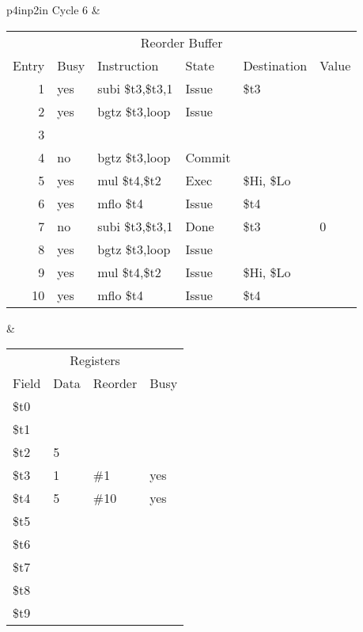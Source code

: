 \noindent
\begin{tabular}{p{4in}p{2in}}
Cycle 6 & \\ \hline \hline

\begin{tabular}{rlp{.9in}lll}
\multicolumn{6}{c}{Reorder Buffer} \\
Entry & Busy & Instruction        & State & Destination & Value \\ \hline
 1    & yes  & subi \$t3,\$t3,1   & Issue & \$t3        &       \\
 2    & yes  & bgtz \$t3,loop     & Issue &             &       \\
 3    &      &                    &       &             &       \\
 4    & no   & bgtz \$t3,loop     & Commit&             &       \\
 5    & yes  & mul  \$t4,\$t2     & Exec  & \$Hi, \$Lo  &       \\
 6    & yes  & mflo \$t4          & Issue & \$t4        &       \\
 7    & no   & subi \$t3,\$t3,1   & Done  & \$t3        & 0     \\
 8    & yes  & bgtz \$t3,loop     & Issue &             &       \\
 9    & yes  & mul  \$t4,\$t2     & Issue & \$Hi, \$Lo  &       \\
10    & yes  & mflo \$t4          & Issue & \$t4        &       \\
\end{tabular} &

\begin{tabular}{llll}
\multicolumn{4}{c}{Registers} \\
Field & Data & Reorder & Busy \\ \hline
\$t0  &      &         &      \\
\$t1  &      &         &      \\
\$t2  & 5    &         &      \\
\$t3  & 1    & \#1     & yes  \\
\$t4  & 5    & \#10    & yes  \\
\$t5  &      &         &      \\
\$t6  &      &         &      \\
\$t7  &      &         &      \\
\$t8  &      &         &      \\
\$t9  &      &         &      \\
\end{tabular} \\


\end{tabular}
